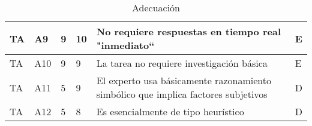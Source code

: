 \documentclass[a4paper,12pt]{article}
\begin{document}
\begin{table}[h]
\begin{tabular}{|l|l|l|l|p{4cm}|l|}
		TA                    & A9                        & 9                & 10                & No requiere respuestas en tiempo real "inmediato“                                                                                   & E                \\ \hline
		TA                    & A10                       & 9                & 9                 & La tarea no requiere investigación básica                                                                                           & E                \\ \hline
		TA                    & A11                       & 5                & 9                 & El experto usa básicamente razonamiento simbólico que implica factores subjetivos                                                   & D                \\ \hline
		TA                    & A12                       & 5                & 8                 & Es esencialmente de tipo heurístico                                                                                                 & D                \\ \hline
	\end{tabular}
	\caption{Adecuación}
	\label{tab:adecuacion}
\end{table}
\end{document}
